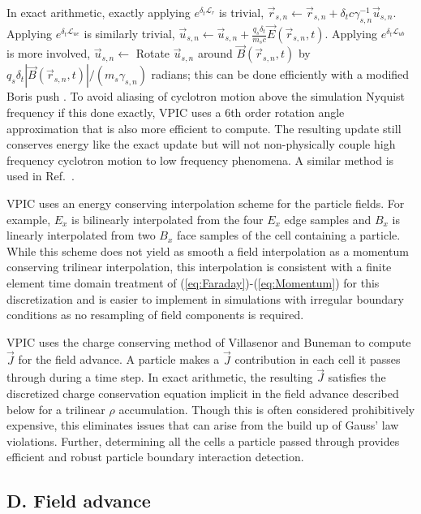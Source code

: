 \documentclass[letter,10pt]{article}
\newcommand{\vecr}{\vec{r}}
\newcommand{\vecu}{\vec{u}}
\newcommand{\vecJ}{\vec{J}}
\newcommand{\vecE}{\vec{E}}
\newcommand{\vecB}{\vec{B}}
\newcommand{\op}{\mathcal{L}}
\newcommand{\eq}[1]{(\ref{eq:#1})}
\begin{document}
In exact arithmetic, exactly applying $e^{\delta_t\op_r}$ is trivial,
$\vecr_{s,n} \leftarrow \vecr_{s,n} + \delta_t
c\gamma_{s,n}^{-1}\vecu_{s,n}$.  Applying $e^{\delta_t\op_{ue}}$ is
similarly trivial, $\vecu_{s,n}\leftarrow\vecu_{s,n} +
\frac{q_s\delta_t}{m_s c}\vecE\left(\vecr_{s,n},t\right)$.
Applying $e^{\delta_t\op_{ub}}$ is more involved, $\vecu_{s,n}
\leftarrow$ Rotate $\vecu_{s,n}$ around
$\vecB\left(\vecr_{s,n},t\right)$ by
$q_s\delta_t\left|\vecB\left(\vecr_{s,n},t\right)\right| /
\left(m_s\gamma_{s,n}\right)$ radians; this can be done efficiently
with a modified Boris push \cite{Boris_1970}.  To avoid aliasing of
cyclotron motion above the simulation Nyquist frequency if this done
exactly, VPIC uses a 6th order rotation angle approximation that is
also more efficient to compute.  The resulting update still conserves
energy like the exact update but will not non-physically couple high
frequency cyclotron motion to low frequency phenomena.  A similar
method is used in Ref.~\cite{Blahovec_et_al_2000}.

VPIC uses an energy conserving interpolation scheme for the particle
fields.  For example, $E_x$ is bilinearly interpolated from the four
$E_x$ edge samples and $B_x$ is linearly interpolated from two $B_x$
face samples of the cell containing a particle.  While this scheme
does not yield as smooth a field interpolation as a momentum
conserving trilinear interpolation, this interpolation is consistent
with a finite element time domain treatment of
\eq{Faraday}-\eq{Momentum} for this discretization
\cite{Eastwood_et_al_1995} and is easier to implement in simulations
with irregular boundary conditions as no resampling of field
components is required.

VPIC uses the charge conserving method of Villasenor and Buneman
\cite{Villasenor_Buneman_1992} to compute $\vecJ$ for the
field advance.  A particle makes a $\vecJ$ contribution in each cell
it passes through during a time step.  In exact arithmetic, the
resulting $\vecJ$ satisfies the discretized charge conservation
equation implicit in the field advance described below for a trilinear
$\rho$ accumulation.  Though this is often considered prohibitively
expensive, this eliminates issues that can arise from the build up of
Gauss' law violations.  Further, determining all the cells a particle
passed through provides efficient and robust particle boundary
interaction detection.

\subsection{D. Field advance}
\end{document}
